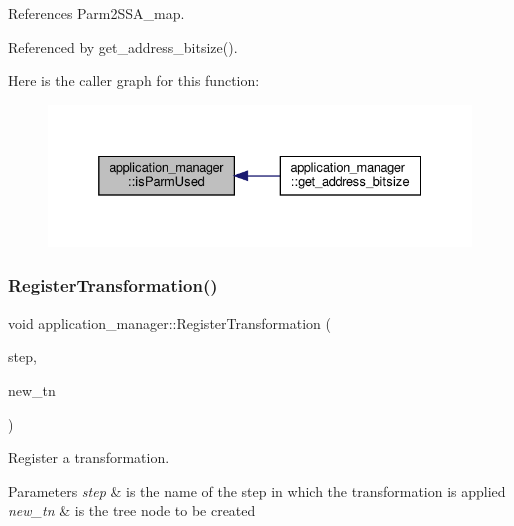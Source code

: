 References Parm2\+S\+S\+A\+\_\+map.



Referenced by get\+\_\+address\+\_\+bitsize().

Here is the caller graph for this function\+:
\nopagebreak
\begin{figure}[H]
\begin{center}
\leavevmode
\includegraphics[width=332pt]{dc/db5/classapplication__manager_a98f01e0832d7103f7c51d7d689bc8daf_icgraph}
\end{center}
\end{figure}
\mbox{\label{classapplication__manager_afd61443628a45c82ceb70e96f5b8f51c}} 
\subsubsection{\texorpdfstring{Register\+Transformation()}{RegisterTransformation()}}
{\footnotesize\ttfamily void application\+\_\+manager\+::\+Register\+Transformation (\begin{DoxyParamCaption}\item[{const std\+::string \&}]{step,  }\item[{const \hyperlink{tree__node_8hpp_a3cf5d02292c940f3892425a5b5fdec3c}{tree\+\_\+node\+Const\+Ref}}]{new\+\_\+tn }\end{DoxyParamCaption})}



Register a transformation. 


\begin{DoxyParams}{Parameters}
{\em step} & is the name of the step in which the transformation is applied \\
\hline
{\em new\+\_\+tn} & is the tree node to be created \\
\hline
\end{DoxyParams}


